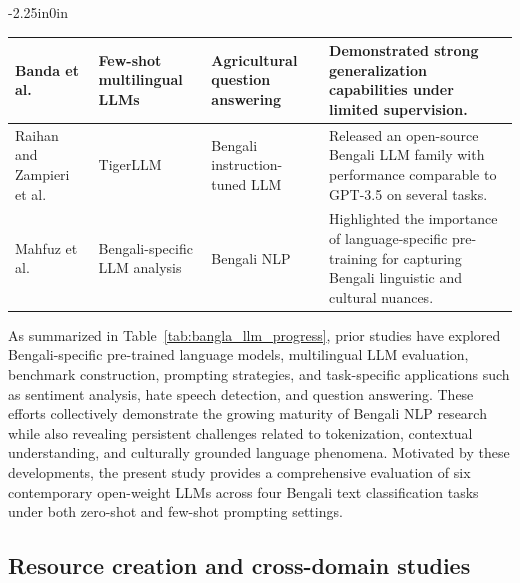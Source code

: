 \documentclass[10pt,letterpaper]{article}
\begin{document}
\begin{table}[!t]
\begin{adjustwidth}{-2.25in}{0in}
\begin{tabular}{|>{\raggedright\arraybackslash}p{3cm}|>{\raggedright\arraybackslash}p{3.0cm}|>{\raggedright\arraybackslash}p{3.0cm}|>{\raggedright\arraybackslash}p{8.1cm}|}
\hline
Banda et al.~\cite{b9} & Few-shot multilingual LLMs & Agricultural question answering & Demonstrated strong generalization capabilities under limited supervision. \\
\hline
Raihan and Zampieri et al.~\cite{b10} & TigerLLM & Bengali instruction-tuned LLM & Released an open-source Bengali LLM family with performance comparable to GPT-3.5 on several tasks. \\
\hline
Mahfuz et al.~\cite{b11} & Bengali-specific LLM analysis & Bengali NLP & Highlighted the importance of language-specific pre-training for capturing Bengali linguistic and cultural nuances. \\
\hline
\end{tabular}
\end{adjustwidth}
\end{table}

As summarized in Table~\ref{tab:bangla_llm_progress}, prior studies have explored Bengali-specific pre-trained language models, multilingual LLM evaluation, benchmark construction, prompting strategies, and task-specific applications such as sentiment analysis, hate speech detection, and question answering. These efforts collectively demonstrate the growing maturity of Bengali NLP research while also revealing persistent challenges related to tokenization, contextual understanding, and culturally grounded language phenomena. Motivated by these developments, the present study provides a comprehensive evaluation of six contemporary open-weight LLMs across four Bengali text classification tasks under both zero-shot and few-shot prompting settings.



\subsection*{Resource creation and cross-domain studies}
\end{document}
